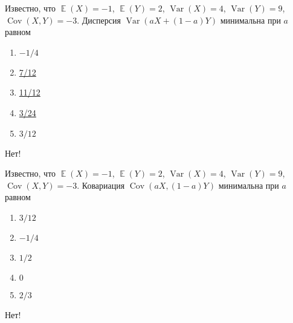 \documentclass[t]{beamer}
\DeclareMathOperator{\Var}{Var}
\DeclareMathOperator{\Cov}{Cov}
\DeclareMathOperator{\E}{\mathbb{E}}
\begin{document}
 \begin{frame} \label{23-No} 
\begin{block}{23} 

Известно, что $\E(X)=-1$, $\E(Y)=2$, $\Var(X)=4$, $\Var(Y)=9$, $\Cov(X,Y)=-3$. Дисперсия $\Var(aX+(1-a)Y)$ минимальна при $a$ равном


 \end{block} 
\begin{enumerate} 
\item[] \hyperlink{23-No}{\beamergotobutton{}  $-1/4$ }
\item[] \hyperlink{23-No}{\beamergotobutton{}  7/12 }
\item[] \hyperlink{23-Yes}{\beamergotobutton{}  11/12 }
\item[] \hyperlink{23-No}{\beamergotobutton{}  3/24 }
\item[] \hyperlink{23-No}{\beamergotobutton{}  $3/12$ }
\end{enumerate} 

 \alert{Нет!} 
\end{frame} 


 \begin{frame} \label{24-No} 
\begin{block}{24} 

Известно, что $\E(X)=-1$, $\E(Y)=2$, $\Var(X)=4$, $\Var(Y)=9$, $\Cov(X,Y)=-3$. Ковариация $\Cov(aX, (1-a)Y)$ минимальна при $a$ равном


 \end{block} 
\begin{enumerate} 
\item[] \hyperlink{24-No}{\beamergotobutton{}  $3/12$ }
\item[] \hyperlink{24-No}{\beamergotobutton{}  $-1/4$ }
\item[] \hyperlink{24-Yes}{\beamergotobutton{}  $1/2$ }
\item[] \hyperlink{24-No}{\beamergotobutton{}  $0$ }
\item[] \hyperlink{24-No}{\beamergotobutton{}  $2/3$ }
\end{enumerate} 

 \alert{Нет!} 
\end{frame} 
\end{document}
